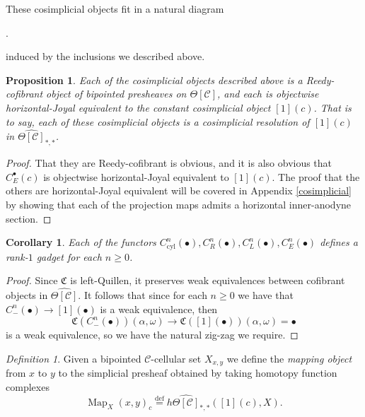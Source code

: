 \documentclass{amsart}
\numberwithin{equation}{section}
\theoremstyle{plain}   %
\newtheorem{prop}[subsection]{Proposition}
\newtheorem{cor}[subsection]{Corollary}
\theoremstyle{remark}
\newtheorem{defn}[subsection]{Definition}
\theoremstyle{plain}
\DeclareMathOperator{\Map}{Map}
\newcommand{\C}{\ensuremath{\mathcal{C}}}
\newcommand{\defeq}{\overset{\mathrm{def}}=}
\newcommand{\cellset}{\ensuremath{\widehat{\Theta[\mathcal{C}]}}}
\begin{document}
These cosimplicial objects fit in a natural diagram
\begin{center}
	.
\end{center}
induced by the inclusions we described above.
\begin{prop}
	Each of the cosimplicial objects described above is a Reedy-cofibrant object of bipointed presheaves on \(\Theta[\C]\), and each is objectwise horizontal-Joyal equivalent to the constant cosimplicial object \([1](c)\).  That is to say, each of these cosimplicial objects is a cosimplicial resolution of \([1](c)\) in \(\cellset_{\ast,\ast}\).
\end{prop}
\begin{proof}
	That they are Reedy-cofibrant is obvious, and it is also obvious that \(C^\bullet_E(c)\) is objectwise horizontal-Joyal equivalent to \([1](c)\).  The proof that the others are horizontal-Joyal equivalent will be covered in Appendix \ref{cosimplicial} by showing that each of the projection maps admits a horizontal inner-anodyne section.
\end{proof}
\begin{cor}
	Each of the functors \(C^n_\mathrm{cyl}(\bullet), C^n_R(\bullet), C^n_L(\bullet), C^n_E(\bullet)\) defines a rank-\(1\) gadget for each \(n\geq 0\).
\end{cor}
\begin{proof}
	Since \(\mathfrak{C}\) is left-Quillen, it preserves weak equivalences between cofibrant objects in \(\cellset\).  It follows that since for each \(n\geq 0\) we have that \(C^n_{-}(\bullet)\to [1](\bullet)\) is a weak equivalence, then
	\[\mathfrak{C}(C^n_{-}(\bullet))(\alpha,\omega) \to \mathfrak{C}([1](\bullet))(\alpha,\omega)=\bullet\]
	is a weak equivalence, so we have the natural zig-zag we require.
\end{proof}
\begin{defn}
	Given a bipointed \(\C\)-cellular set \(X_{x,y}\) we define the \emph{mapping object} from \(x\) to \(y\) to the simplicial presheaf obtained by taking homotopy function complexes
	\[\Map_X(x,y)_c\defeq h\cellset_{\ast,\ast}([1](c), X).\]
\end{defn}
\end{document}
